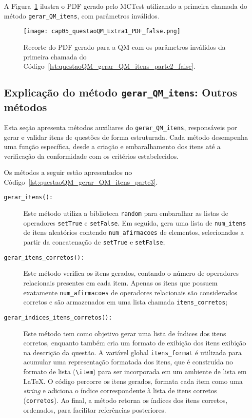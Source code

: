 A Figura~\ref{fig:questaoQM_Extra1_PDF_false} ilustra o PDF gerado pelo MCTest utilizando a primeira chamada do método \texttt{gerar\_QM\_itens}, com parâmetros inválidos.

\begin{figure}[!ht]
    \texttt{[image: cap05\_questaoQM\_Extra1\_PDF\_false.png]}
    \caption{Recorte do PDF gerado para a QM com os parâmetros inválidos da primeira chamada do Código~\ref{lst:questaoQM_gerar_QM_itens_parte2_false}.}
    \label{fig:questaoQM_Extra1_PDF_false}
\end{figure}

\subsection{Explicação do método \texttt{gerar\_QM\_itens}: Outros métodos}

Esta seção apresenta métodos auxiliares do \texttt{gerar\_QM\_itens}, responsáveis por gerar e validar itens de questões de forma estruturada. Cada método desempenha uma função específica, desde a criação e embaralhamento dos itens até a verificação da conformidade com os critérios estabelecidos.

Os métodos a seguir estão apresentados no Código~\ref{lst:questaoQM_gerar_QM_itens_parte3}.

\begin{description}
    \item[\texttt{gerar\_itens():}]
    Este método utiliza a biblioteca \verb|random| para embaralhar as listas de operadores \verb|setTrue| e \verb|setFalse|. Em seguida, gera uma lista de \verb|num_itens| de itens aleatórios contendo \verb|num_afirmacoes| de elementos, selecionados a partir da concatenação de \verb|setTrue| e \verb|setFalse|;

    \item[\texttt{gerar\_itens\_corretos():}]
    Este método verifica os itens gerados, contando o número de operadores relacionais presentes em cada item. Apenas os itens que possuem exatamente \verb|num_afirmacoes| de operadores relacionais são considerados corretos e são armazenados em uma lista chamada \verb|itens_corretos|;

    \item[\texttt{gerar\_indices\_itens\_corretos():}]
    Este método tem como objetivo gerar uma lista de índices dos itens corretos, enquanto também cria um formato de exibição dos itens exibição na descrição da questão. A variável global \verb|itens_format| é utilizada para acumular uma representação formatada dos itens, que é construída no formato de lista (\texttt{\textbackslash item}) para ser incorporada em um ambiente de lista em \LaTeX. O código percorre os itens gerados, formata cada item como uma \textit{string} e adiciona o índice correspondente à lista de itens corretos (\verb|corretos|). Ao final, a método retorna os índices dos itens corretos, ordenados, para facilitar referências posteriores.
\end{description}


